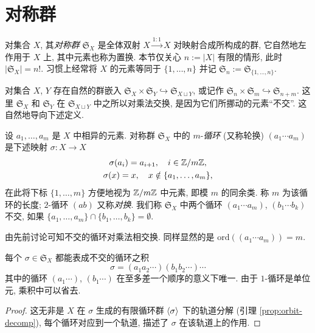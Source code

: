 \section{对称群}\label{sec:symmetric-group}
对集合 $X$, 其\emph{对称群} $\mathfrak{S}_X$ 是全体双射 $X \xrightarrow{1:1} X$ 对映射合成所构成的群, 它自然地左作用于 $X$ 上, 其中元素也称为置换. 本节仅关心 $n := |X|$ 有限的情形, 此时 $|\mathfrak{S}_X| = n!$. 习惯上经常将 $X$ 的元素等同于 $\{1, \ldots, n\}$ 并记 $\mathfrak{S}_n := \mathfrak{S}_{\{1, \ldots, n\}}$. 

对集合 $X$, $Y$ 存在自然的群嵌入 $\mathfrak{S}_X \times \mathfrak{S}_Y \hookrightarrow \mathfrak{S}_{X \sqcup Y}$, 或记作 $\mathfrak{S}_n \times \mathfrak{S}_m \hookrightarrow \mathfrak{S}_{n+m}$. 这里 $\mathfrak{S}_X$ 和 $\mathfrak{S}_Y$ 在 $\mathfrak{S}_{X \sqcup Y}$ 中之所以对乘法交换, 是因为它们所挪动的元素``不交''. 这自然地导向下述定义.

\begin{definition} 
	设 $a_1, \ldots, a_m$ 是 $X$ 中相异的元素. 对称群 $\mathfrak{S}_X$ 中的 $m$-\emph{循环} (又称轮换) $(a_1 \cdots a_m)$ 是下述映射 $\sigma: X \to X$
	\begin{gather*}
		\sigma(a_i) = a_{i+1}, \quad i \in \mathbb{Z}/m\mathbb{Z}, \\
		\sigma(x)=x, \quad x \notin \{a_1, \ldots, a_m\},
	\end{gather*}
	在此将下标 $\{1, \ldots, m\}$ 方便地视为 $\mathbb{Z}/m\mathbb{Z}$ 中元素, 即模 $m$ 的同余类. 称 $m$ 为该循环的长度; $2$-循环 $(a b)$ 又称\emph{对换}. 我们称 $\mathfrak{S}_X$ 中两个循环 $(a_1 \cdots a_m)$, $(b_1 \cdots b_k)$ 不交, 如果 $\{a_1, \ldots, a_m\} \cap \{b_1, \ldots, b_k\} = \emptyset$. 
\end{definition}
由先前讨论可知不交的循环对乘法相交换. 同样显然的是 $\text{ord}((a_1 \cdots a_m)) = m$.

\begin{proposition}[循环分解]\label{prop:cyclic-decomposition}
	每个 $\sigma \in \mathfrak{S}_X$ 都能表成不交的循环之积
	\[ \sigma = (a_1 a_2 \cdots) (b_1 b_2 \cdots) \cdots \]
	其中的循环 $(a_1 \cdots)$, $(b_1 \cdots)$ 在至多差一个顺序的意义下唯一. 由于 $1$-循环是单位元, 乘积中可以省去.
\end{proposition}
\begin{proof}
	这无非是 $X$ 在 $\sigma$ 生成的有限循环群 $\left\langle \sigma \right\rangle$ 下的轨道分解 (引理 \ref{prop:orbit-decomp}), 每个循环对应到一个轨道, 描述了 $\sigma$ 在该轨道上的作用.
\end{proof}

